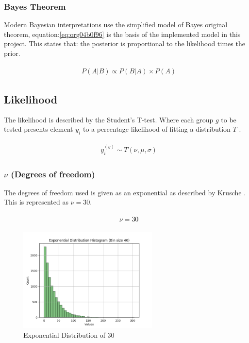 \documentclass[11pt]{report}
\begin{document}
\subsubsection{Bayes Theorem}
\label{sec:orgf87da98}

Modern Bayesian interpretations use the simplified model of Bayes original theorem, equation:\ref{eq:org04b0f96} is the basis of the implemented model in this project. This states that: the posterior is proportional to the likelihood times the prior.

\begin{align}
\label{eq:org04b0f96}
  &\begin{aligned}
  P(A|B) \propto P(B|A) \times P(A)
  \end{aligned}
\end{align}


\subsection{Likelihood}
\label{sec:org9ecf6bd}
The likelihood is described by the Student's T-test. Where each group \(g\) to be tested presents element \(y_i\) to a percentage likelihood of fitting a distribution \(T\) .

 \begin{align}
\label{eq:orgaa8f721}
   &\begin{aligned}
y_i^{(g)} \sim T(\nu, \mu, \sigma)
   \end{aligned}
 \end{align}

\subsubsection{\(\nu\) (Degrees of freedom)}
\label{sec:org246eaaa}
The degrees of freedom used is given as an exponential as described by
Krusche \cite{Kruschke2012}. This is represented as \(\nu = 30\).

 \begin{align}
\label{eq:orged47056}
   &\begin{aligned}
\nu = 30
   \end{aligned}
 \end{align}

\begin{figure}[htbp]
\centering
\includegraphics[width=7cm]{./images/dist2.png}
\caption{\label{fig:org2925053}
Exponential Distribution of 30}
\end{figure}
\end{document}

